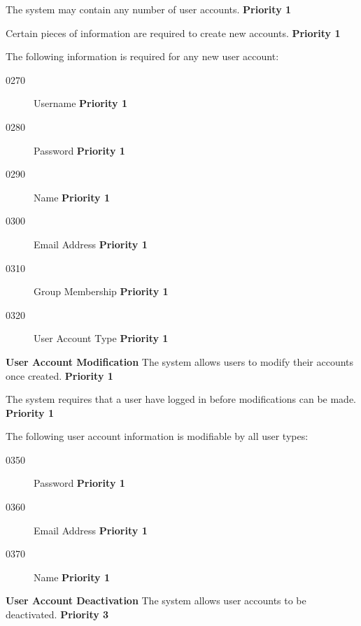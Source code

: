 \documentclass{article}
\begin{document}
\begin{description}
  \begin{description}
  \item[0250] The system may contain any number of user
    accounts. \textbf{Priority 1}
  \item[0260] Certain pieces of information are required to create new
    accounts. \textbf{Priority 1}
  \item The following information is required for any new user
    account:

    \begin{description}
    \item[0270] Username \textbf{Priority 1}
    \item[0280] Password \textbf{Priority 1}
    \item[0290] Name \textbf{Priority 1}
    \item[0300] Email Address \textbf{Priority 1}
    \item[0310] Group Membership \textbf{Priority 1}
    \item[0320] User Account Type \textbf{Priority 1}
    \end{description}

  \end{description}

  \item[0330]\textbf{User Account Modification} The system allows users to
    modify their accounts once created. \textbf{Priority 1} 

    \begin{description}

  \item[0340]The system requires that a user have logged in before
    modifications can be made. \textbf{Priority 1}
  \item The following user account information is modifiable by all
    user types:

    \begin{description}
    \item[0350]Password \textbf{Priority 1}
    \item[0360]Email Address \textbf{Priority 1}
    \item[0370]Name \textbf{Priority 1}
    \end{description}
    \end{description}

    
  \item[0380] \textbf{User Account Deactivation} The system allows user
    accounts to be deactivated. \textbf{Priority 3}


\end{description}
\end{document}
